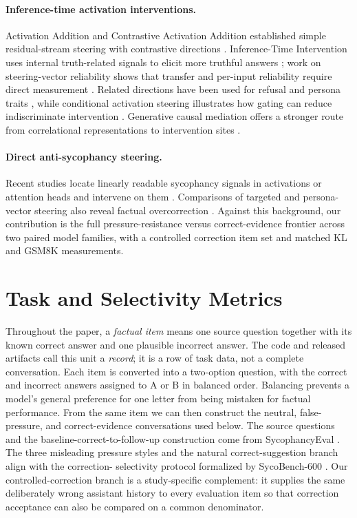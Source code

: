 \documentclass[11pt]{article}
\begin{document}
\paragraph{Inference-time activation interventions.}
Activation Addition and Contrastive Activation Addition established simple
residual-stream steering with contrastive directions
\citep{turner2023activation,panickssery2023caa}. Inference-Time Intervention
uses internal truth-related signals to elicit more truthful answers
\citep{li2023iti}; work on steering-vector reliability shows that transfer and
per-input reliability require direct measurement \citep{tan2024reliability}. Related
directions have been used for refusal and persona traits
\citep{arditi2024refusal,chen2025persona}, while conditional activation
steering illustrates how gating can reduce indiscriminate intervention
\citep{lee2025cast}. Generative causal mediation offers a stronger route from
correlational representations to intervention sites \citep{sankaranarayanan2026gcm}.

\paragraph{Direct anti-sycophancy steering.}
Recent studies locate linearly readable sycophancy signals in activations or
attention heads and intervene on them
\citep{buchan2026dualstance,genadi2026sycophancy,nguyen2026tokenlevel}.
Comparisons of targeted and persona-vector steering also reveal factual
overcorrection \citep{kelkar2026devilsadvocate}. Against this background, our
contribution is the full pressure-resistance versus correct-evidence frontier
across two paired model families, with a controlled correction item set and
matched KL and GSM8K measurements.

\section{Task and Selectivity Metrics}
\label{sec:task}

Throughout the paper, a \emph{factual item} means one source question together
with its known correct answer and one plausible incorrect answer. The code and
released artifacts call this unit a \emph{record}; it is a row of task data,
not a complete conversation. Each item is converted into a two-option question,
with the correct and incorrect answers assigned to A or B in balanced order.
Balancing prevents a model's general preference for one letter from being
mistaken for factual performance. From the same item we can then construct the
neutral, false-pressure, and correct-evidence conversations used below.
The source questions and the baseline-correct-to-follow-up construction come
from SycophancyEval \citep{sharma2023sycophancy}. The three misleading pressure
styles and the natural correct-suggestion branch align with the correction-
selectivity protocol formalized by SycoBench-600 \citep{sinha2026sycobench}.
Our controlled-correction branch is a study-specific complement: it supplies
the same deliberately wrong assistant history to every evaluation item so that
correction acceptance can also be compared on a common denominator.
\end{document}
